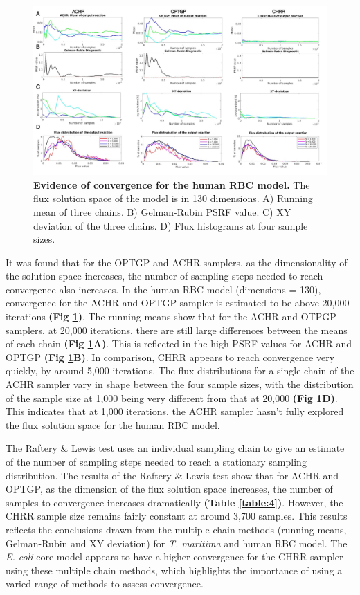 \documentclass[10pt,letterpaper]{article}
\begin{document}
\begin{figure}[!ht]
\begin{adjustwidth}{-2.25in}{0in}
\includegraphics[scale=0.34]{Fig4.png}
\caption{{\bf Evidence of convergence for the human RBC model.}
The flux solution space of the model is in 130 dimensions. A) Running mean of three chains. B) Gelman-Rubin PSRF value. C) XY deviation of the three chains. D) Flux histograms at four sample sizes.}
\label{figure:4}
\end{adjustwidth}
\end{figure}

It was found that for the OPTGP and ACHR samplers, as the dimensionality of the solution space increases, the number of sampling steps needed to reach convergence also increases. In the human RBC model (dimensions = 130), convergence for the ACHR and OPTGP sampler is estimated to be above 20,000 iterations \textbf{(Fig \ref{figure:4})}. The running means show that for the ACHR and OTPGP samplers, at 20,000 iterations, there are still large differences between the means of each chain \textbf{(Fig \ref{figure:4}A)}. This is reflected in the high PSRF values for ACHR and OPTGP \textbf{(Fig \ref{figure:4}B)}. In comparison, CHRR appears to reach convergence very quickly, by around 5,000 iterations. The flux distributions for a single chain of the ACHR sampler vary in shape between the four sample sizes, with the distribution of the sample size at 1,000 being very different from that at 20,000 \textbf{(Fig \ref{figure:4}D)}. This indicates that at 1,000 iterations, the ACHR sampler hasn’t fully explored the flux solution space for the human RBC model. 

The Raftery \& Lewis test uses an individual sampling chain to give an estimate of the number of sampling steps needed to reach a stationary sampling distribution. The results of the Raftery \& Lewis test show that for ACHR and OPTGP, as the dimension of the flux solution space increases, the number of samples to convergence increases dramatically \textbf{(Table \ref{table:4})}. However, the CHRR sample size remains fairly constant at around 3,700 samples. This results reflects the conclusions drawn from the multiple chain methods (running means, Gelman-Rubin and XY deviation) for \textit{T. maritima} and human RBC model. The \textit{E. coli} core model appears to have a higher convergence for the CHRR sampler using these multiple chain methods, which highlights the importance of using a varied range of methods to assess convergence. 
\end{document}
